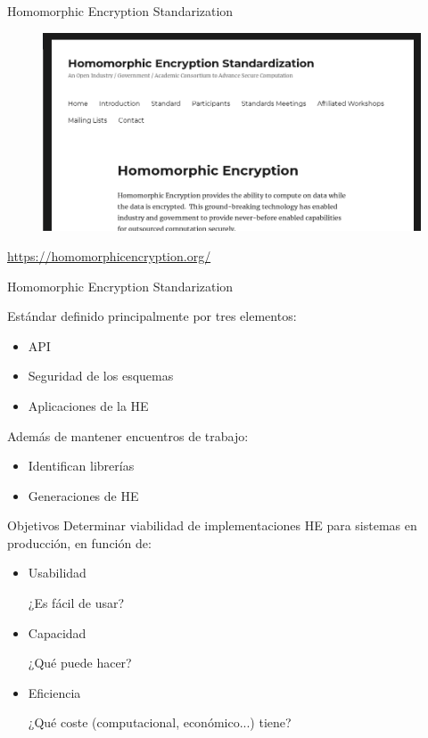 \documentclass{beamer}
\begin{document}
\begin{frame}{Homomorphic Encryption Standarization}
    \begin{figure}
        \centering\includegraphics[width=\textwidth]{he-standard}
    \end{figure}
    \centering\url{https://homomorphicencryption.org/}

\end{frame}

\begin{frame}{Homomorphic Encryption Standarization}

    Estándar definido principalmente por tres elementos:
    
    \begin{itemize}
        \item API
        \item Seguridad de los esquemas
        \item Aplicaciones de la HE
    \end{itemize}{}
    
    Además de mantener encuentros de trabajo:
    
    \begin{itemize}
        \item Identifican librerías
        \item Generaciones de HE
    \end{itemize}

\end{frame}

\begin{frame}{Objetivos}
    Determinar viabilidad de implementaciones HE para sistemas en producción, en función de:
    \begin{itemize}
        \item Usabilidad
        
        ¿Es fácil de usar?
        
        \item Capacidad
        
        ¿Qué puede hacer?
        
        \item Eficiencia
        
        ¿Qué coste (computacional, económico...) tiene?
        
    \end{itemize}
\end{frame}
\end{document}
